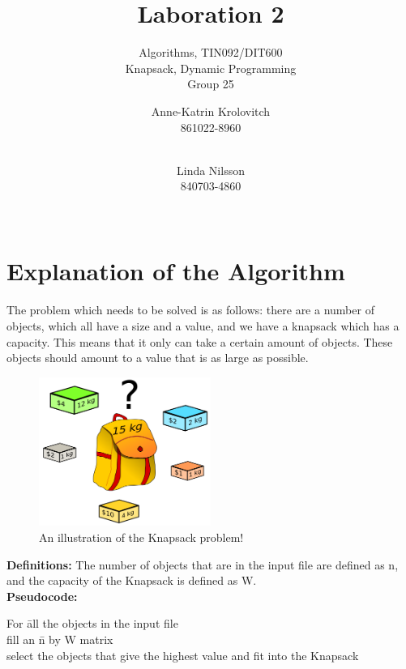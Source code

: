 \documentclass{inc/mas}
\title{Laboration 2 }
\subtitle{Algorithms, TIN092/DIT600\\ Knapsack, Dynamic Programming \\ Group 25}
\affiliation{}
\begin{document}
\author{Anne-Katrin Krolovitch \\ 861022-8960\\ \\ \and
Linda Nilsson \\ 840703-4860 \\ \\ \tabularnewline
}
\maketitle
\section{Explanation of the Algorithm} 
 \noindent The problem which needs to be solved is as follows: there are a number of objects, which all have a size and a value, and we have a knapsack which has a capacity. This means that it only can take a certain amount of objects. These objects should amount to a value that is as large as possible.\\

\begin{figure}[h!]
  \centering
      \includegraphics[width=0.5\textwidth]{Knapsack.png}
  \caption{An illustration of the Knapsack problem! \citep{wikipic} }
\end{figure}



\textbf{Definitions:} The number of objects that are in the input file are defined as n, and the capacity of the Knapsack is defined as W.\\

\noindent \textbf{Pseudocode:}
\begin{tabbing}
For \= all the objects in the input file \\
\> fill an \= n by W matrix	\\
\> select the objects that give the highest value and fit into the Knapsack\\
\end{tabbing}
\end{document}
